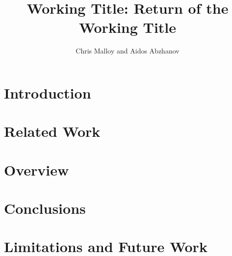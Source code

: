 \documentclass[twocolumn,11pt,notitlepage,oneside]{article}
\title{Working Title: Return of the Working Title}
\author{Chris Malloy and Aidos Abzhanov}
\date{}
\begin{document}
\maketitle

\section{Introduction}


\section{Related Work}


\section{Overview}


\section{Conclusions}


\section{Limitations and Future Work}

\end{document}
